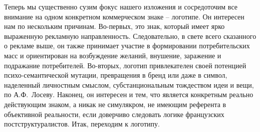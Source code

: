 Теперь мы существенно сузим фокус нашего изложения и сосредоточим все внимание
на одном конкретном коммерческом знаке -- логотипе. Он интересен нам по нескольким
причинам. Во-первых, это знак, который имеет ярко выраженную рекламную
направленность. Следовательно, в свете всего сказанного о рекламе выше, он
также принимает участие в формировании потребительских масс и ориентирован на
возбуждение желаний, внушение, заражение и подражание потребителей. Во-вторых,
логотип привлекателен своей потенцией психо-семантической мутации, превращения в
бренд или даже в символ, наделенный личностным смыслом, субстанциональным тождеством
идеи и вещи, по А.Ф.~Лосеву. Наконец, он интересен и тем, что является конкретным
реально действующим знаком, а никак не симулякром, не имеющим референта в
объективной реальности, если доверчиво следовать логике французских
постструктуралистов. Итак, переходим к логотипу.

